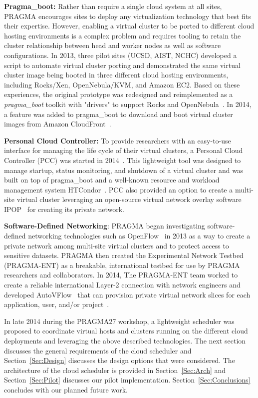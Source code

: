 \documentclass[times]{cpeauth}
\begin{document}
\textbf{Pragma\_boot:}  Rather than require a single cloud system at all sites, PRAGMA encourages sites to  deploy any virtualization technology that best fits their expertise. However, enabling a virtual cluster to be ported to different cloud hosting environments is a complex problem and requires tooling to retain the cluster relationship between head and worker nodes as well as software configurations.  In 2013, three pilot sites (UCSD, AIST, NCHC) developed a script to automate virtual cluster porting and demonstrated the same virtual cluster image being booted in three different cloud hosting environments, including Rocks/Xen, OpenNebula/KVM, and Amazon EC2.  Based on these experiences, the original prototype was redesigned and reimplemented as a \textit{pragma\_boot} toolkit with "drivers" to support  Rocks and OpenNebula~\cite{pragmaboot}.  In 2014, a feature was added to pragma\_boot to download and boot virtual cluster images from Amazon CloudFront~\cite{cloudfront}.

\textbf{Personal Cloud Controller:}  To provide researchers with an easy-to-use interface for managing the life cycle of their virtual clusters, a Personal Cloud Controller (PCC)  was started in 2014~\cite{pcc}. This lightweight tool was designed to manage startup, status monitoring, and shutdown of a virtual cluster and was built on top of pragma\_boot and a well-known resource and workload management system HTCondor~\cite{condor}.   PCC also provided an option to create a multi-site virtual cluster leveraging an open-source virtual network overlay software IPOP~\cite{ipop} for creating its private network.  

\textbf{Software-Defined Networking}:   PRAGMA began investigating software-defined networking technologies such as OpenFlow~\cite{openflow} in 2013 as a way to create a private network among multi-site virtual clusters and to protect access to sensitive datasets.  PRAGMA then created the Experimental Network Testbed (PRAGMA-ENT) as a breakable, international testbed for use by PRAGMA researchers and collaborators.  In 2014, The PRAGMA-ENT team worked to create a reliable international Layer-2 connection with network engineers and developed AutoVFlow~\cite{autovflow} that can provision private virtual network slices for each application, user, and/or project~\cite{pragmaReport2014}.  

In late 2014 during the PRAGMA27 workshop, a lightweight scheduler was proposed to coordinate virtual hosts and clusters running on the different cloud deployments  and leveraging the above described technologies.  The next section discusses the general requirements of the cloud scheduler and Section~\ref{Sec:Design} discusses the design options that were considered.  The architecture of the cloud scheduler is provided in Section~\ref{Sec:Arch} and Section~\ref{Sec:Pilot} discusses our pilot implementation.  Section~\ref{Sec:Conclusions} concludes with our planned future work.  
\end{document}
